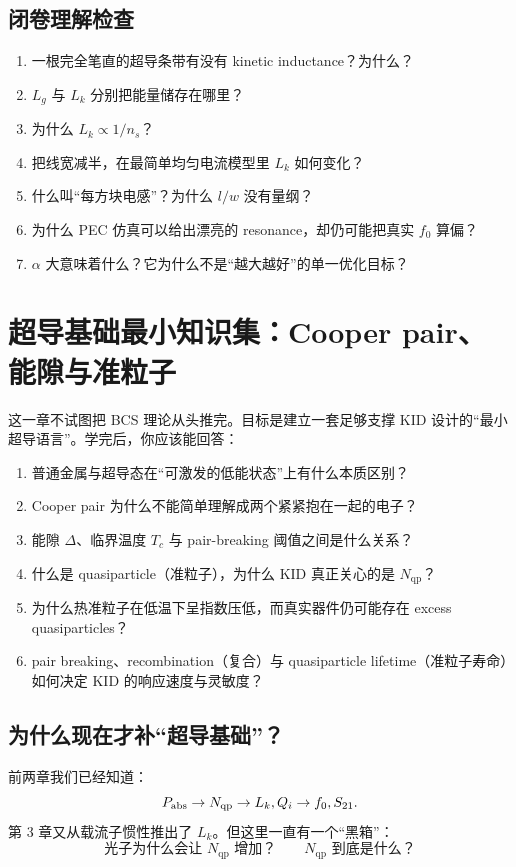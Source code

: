 \documentclass[11pt,a4paper,openany]{ctexrep}
\newcommand{\qp}{\mathrm{qp}}
\begin{document}
\section{闭卷理解检查}
\begin{checkpointbox}
\begin{enumerate}
  \item 一根完全笔直的超导条带有没有 kinetic inductance？为什么？
  \item $L_g$ 与 $L_k$ 分别把能量储存在哪里？
  \item 为什么 $L_k\propto1/n_s$？
  \item 把线宽减半，在最简单均匀电流模型里 $L_k$ 如何变化？
  \item 什么叫“每方块电感”？为什么 $l/w$ 没有量纲？
  \item 为什么 PEC 仿真可以给出漂亮的 resonance，却仍可能把真实 $f_0$ 算偏？
  \item $\alpha$ 大意味着什么？它为什么不是“越大越好”的单一优化目标？
\end{enumerate}
\end{checkpointbox}

\chapter{超导基础最小知识集：Cooper pair、能隙与准粒子}

\begin{goalbox}
这一章不试图把 BCS 理论从头推完。目标是建立一套足够支撑 KID 设计的“最小超导语言”。学完后，你应该能回答：
\begin{enumerate}
  \item 普通金属与超导态在“可激发的低能状态”上有什么本质区别？
  \item Cooper pair 为什么不能简单理解成两个紧紧抱在一起的电子？
  \item 能隙 $\Delta$、临界温度 $T_c$ 与 pair-breaking 阈值之间是什么关系？
  \item 什么是 quasiparticle（准粒子），为什么 KID 真正关心的是 $N_{\qp}$？
  \item 为什么热准粒子在低温下呈指数压低，而真实器件仍可能存在 excess quasiparticles？
  \item pair breaking、recombination（复合）与 quasiparticle lifetime（准粒子寿命）如何决定 KID 的响应速度与灵敏度？
\end{enumerate}
\end{goalbox}

\section{为什么现在才补“超导基础”？}
前两章我们已经知道：
\[
P_{\rm abs}\rightarrow N_{\qp}\rightarrow L_k,Q_i\rightarrow f_0,S_{21}.
\]
第 3 章又从载流子惯性推出了 $L_k$。但这里一直有一个“黑箱”：
\[
\boxed{\text{光子为什么会让 }N_{\qp}\text{ 增加？}\qquad
N_{\qp}\text{ 到底是什么？}}
\]
\end{document}
